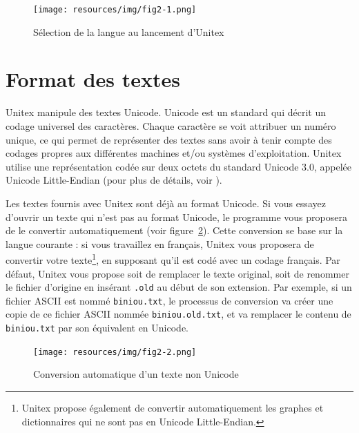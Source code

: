 \begin{figure}[!ht]
\begin{center}
\texttt{[image: resources/img/fig2-1.png]}
\caption{\label{fig-language-selection}Sélection de la langue au lancement d’Unitex}
\end{center}
\end{figure}


\section{Format des textes}
\label{section-conversion-texte-unicode}
Unitex manipule des textes Unicode. Unicode est un standard qui décrit un codage universel 
des caractères. Chaque caractère se voit attribuer un numéro unique, ce qui permet
de représenter des textes sans avoir à tenir compte des codages propres aux différentes 
machines et/ou systèmes d’exploitation. Unitex utilise une représentation codée sur deux 
octets du standard Unicode 3.0, appelée Unicode Little-Endian (pour plus de détails, voir
\cite{UNICODE}).

\bigskip
{}
\noindent Les textes fournis avec Unitex sont déjà au format Unicode. Si vous essayez d’ouvrir un
texte qui n’est pas au format Unicode, le programme vous proposera de le convertir automatiquement 
(voir figure~\ref{auto-transcoding}). Cette conversion se base sur la langue courante : si vous
travaillez en français, Unitex vous proposera de convertir votre texte\footnote{Unitex propose
également de convertir automatiquement les graphes et dictionnaires qui ne sont pas en Unicode
Little-Endian.}, en supposant qu’il est codé avec un codage français. Par défaut, Unitex vous
propose soit de remplacer le texte original, soit de renommer le fichier d’origine en insérant
\verb$.old$ au début de son extension. Par exemple, si un fichier ASCII est nommé \verb$biniou.txt$,
le processus de conversion va créer une copie de ce fichier ASCII nommée \verb$biniou.old.txt$, et
va remplacer le contenu de \verb$biniou.txt$ par son équivalent en Unicode.

\begin{figure}[!ht]
\begin{center}
\texttt{[image: resources/img/fig2-2.png]}
\caption{\label{auto-transcoding}Conversion automatique d’un texte non Unicode}
\end{center}
\end{figure}

